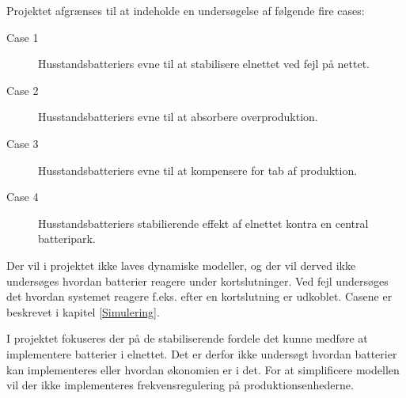 
\label{Afgraensning}

Projektet afgrænses til at indeholde en undersøgelse af følgende fire cases:

\begin{description}
	\item[Case 1] Husstandsbatteriers evne til at stabilisere elnettet ved fejl på nettet.
	\item[Case 2] Husstandsbatteriers evne til at absorbere overproduktion.
	\item[Case 3] Husstandsbatteriers evne til at kompensere for tab af produktion.
	\item[Case 4] Husstandsbatteriers stabilierende effekt af elnettet kontra en central batteripark.
\end{description}	

Der vil i projektet ikke laves dynamiske modeller, og der vil derved ikke undersøges hvordan batterier reagere under kortslutninger. Ved fejl undersøges det hvordan systemet reagere f.eks. efter en kortslutning er udkoblet. Casene er beskrevet i kapitel \ref{Simulering}.	

I projektet fokuseres der på de stabiliserende fordele det kunne medføre at implementere batterier i elnettet. Det er derfor ikke undersøgt hvordan batterier kan implementeres eller hvordan økonomien er i det. For at simplificere modellen vil der ikke implementeres frekvensregulering på produktionsenhederne.